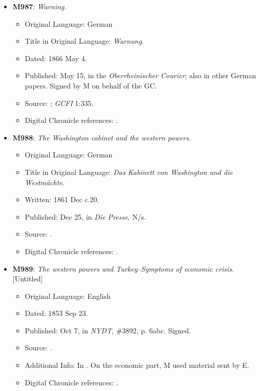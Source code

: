 \begin{itemize}
    \item \textbf{M987}: \textit{Warning}.
    \begin{itemize}
        \item Original Language: German
        \item Title in Original Language: \textit{Warnung}.
        \item Dated: 1866 May 4.
        \item Published: May 15, in the \textit{Oberrheinischer Courier}; also in other German papers. Signed by M on behalf of the GC.
        \item Source: ; \textit{GCFI} 1:335.
        \item Digital Chronicle references: .
    \end{itemize}

    \item \textbf{M988}: \textit{The Washington cabinet and the western powers}.
    \begin{itemize}
        \item Original Language: German
        \item Title in Original Language: \textit{Das Kabinett von Washington und die Westmächte}.
        \item Written: 1861 Dec c.20.
        \item Published: Dec 25, in \textit{Die Presse}. N/s.
        \item Source: .
        \item Digital Chronicle references: .
    \end{itemize}

    \item \textbf{M989}: \textit{The western powers and Turkey--Symptoms of economic crisis}. [Untitled]
    \begin{itemize}
        \item Original Language: English
        \item Dated: 1853 Sep 23.
        \item Published: Oct 7, in \textit{NYDT}, \#3892, p. 6abc. Signed.
        \item Source: .
        \item Additional Info: In . On the economic part, M used material sent by E.
        \item Digital Chronicle references: .
    \end{itemize}


\end{itemize}
